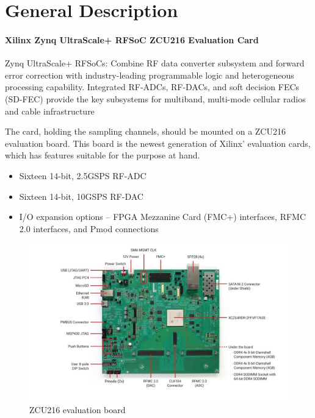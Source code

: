\section{General Description}
\paragraph{Xilinx Zynq UltraScale+ RFSoC ZCU216 Evaluation Card}
Zynq UltraScale+ RFSoCs: Combine RF data converter subsystem and forward error correction with industry-leading
programmable logic and heterogeneous processing capability. Integrated RF-ADCs, RF-DACs, and soft decision FECs (SD-FEC)
provide the key subsystems for multiband, multi-mode cellular radios and cable infrastructure


The card, holding the sampling channels, should be mounted on a ZCU216 evaluation board. This board is the newest generation of Xilinx' evaluation cards, which has features suitable for the purpose at hand.
\begin{itemize}[noitemsep]
	\item Sixteen 14-bit, 2.5GSPS RF-ADC
	\item Sixteen 14-bit, 10GSPS RF-DAC
	\item I/O expansion options – FPGA Mezzanine Card (FMC+) interfaces, RFMC 2.0 interfaces, and Pmod connections
\end{itemize}
\begin{figure}[tbh]
	\centering
	\includegraphics[width = \textwidth]{chap/04-work/img/zcu216}
	\caption{ZCU216 evaluation board}
	\label{fig:zcu216}
\end{figure}

